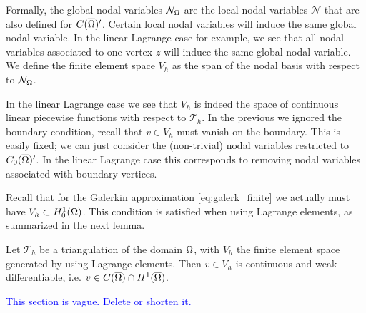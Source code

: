 \documentclass[thesis.tex]{subfiles}
\begin{document}
  Formally, the global nodal variables $\mathcal{N}_\Omega$ are the local nodal variables $\mathcal{N}$ that are also defined for $C(\overline{\Omega})'$. Certain
  local nodal variables will induce the same global nodal variable. In the linear Lagrange case for example, we see that all nodal variables
  associated to one vertex $z$ will induce the same global nodal variable. We define the finite element space $V_h$ as the span of the 
  nodal basis with respect to $\mathcal{N}_\Omega$. 
  
  In the linear Lagrange case we see that $V_h$ is indeed the space of continuous linear piecewise
  functions with respect to $\mathcal{T}_h$. In the previous we ignored
  the boundary condition, recall that $v \in V_h$ must vanish on the boundary. This is easily fixed; we can just consider the (non-trivial)
  nodal variables restricted to $C_0(\overline{\Omega})'$. In the linear Lagrange case this corresponds to removing nodal variables associated with
  boundary vertices.  
  
  Recall that for the Galerkin approximation \eqref{eq:galerk_finite} we actually must have $V_h \subset H^1_0(\Omega)$. This
  condition is satisfied when using Lagrange elements, as summarized in the next lemma.
  \begin{lem}
    \label{lem:lin_lagrange}
    Let $\mathcal{T}_h$ be a triangulation of the domain $\Omega$, with $V_h$ the finite element space generated
    by using Lagrange elements. Then $v \in V_h$ is continuous and weak differentiable, i.e. $v \in C(\overline{\Omega}) \cap H^1(\overline{\Omega})$. 
  \end{lem}
  
  \textcolor{blue}{This section is vague. Delete or shorten it. }
\end{document}
